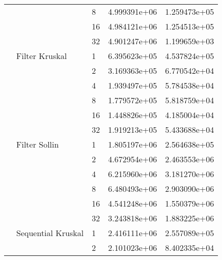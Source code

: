 \begin{tabular}{lllrr}
                                                       &                     & 8  &  4.999391e+06 &  1.259473e+05 \\
                                                       &                     & 16 &  4.984121e+06 &  1.254513e+05 \\
                                                       &                     & 32 &  4.901247e+06 &  1.199659e+03 \\
                                                       & Filter Kruskal & 1  &  6.395623e+05 &  4.537824e+05 \\
                                                       &                     & 2  &  3.169363e+05 &  6.770542e+04 \\
                                                       &                     & 4  &  1.939497e+05 &  5.784538e+04 \\
                                                       &                     & 8  &  1.779572e+05 &  5.818759e+04 \\
                                                       &                     & 16 &  1.448826e+05 &  4.185004e+04 \\
                                                       &                     & 32 &  1.919213e+05 &  5.433688e+04 \\
                                                       & Filter Sollin & 1  &  1.805197e+06 &  2.564638e+05 \\
                                                       &                     & 2  &  4.672954e+06 &  2.463553e+06 \\
                                                       &                     & 4  &  6.215960e+06 &  3.181270e+06 \\
                                                       &                     & 8  &  6.480493e+06 &  2.903090e+06 \\
                                                       &                     & 16 &  4.541248e+06 &  1.550379e+06 \\
                                                       &                     & 32 &  3.243818e+06 &  1.883225e+06 \\
                                                       & Sequential Kruskal & 1  &  2.416111e+06 &  2.557089e+05 \\
                                                       &                     & 2  &  2.101023e+06 &  8.402335e+04 \\

\end{tabular}

